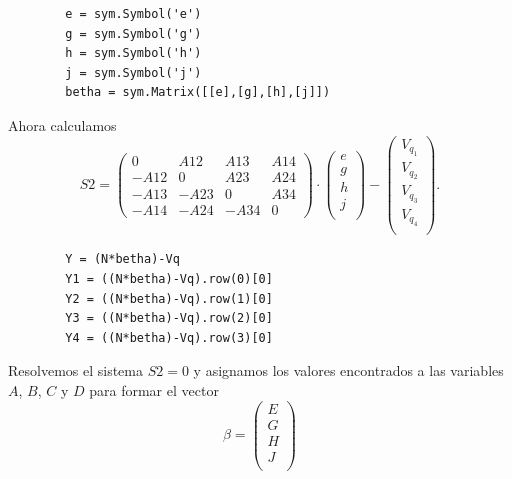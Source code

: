 \documentclass[a4paper,10pt]{book}
\begin{document}
\lstset{stepnumber=0}
\begin{lstlisting}
        e = sym.Symbol('e')
        g = sym.Symbol('g')
        h = sym.Symbol('h')
        j = sym.Symbol('j')            
        betha = sym.Matrix([[e],[g],[h],[j]])
\end{lstlisting}
Ahora calculamos 
\[ S2 = \left( \begin{array}{cccc}
              0   & A12  & A13  & A14  \\
             -A12 & 0    & A23  & A24  \\
             -A13 & -A23 & 0    & A34  \\
             -A14 & -A24 & -A34 & 0   
             \end{array}
   \right) \cdot \left( \begin{array}{c}
               			e \\
               			g \\ 
               			h \\
               			j \\
                   		\end{array}
                 \right)- \left( \begin{array}{c}
               			V_{q_{1}} \\
               			V_{q_{2}} \\ 
               			V_{q_{3}}\\
               			V_{q_{4}} \\
                   		\end{array}
                 \right) .\]
\lstset{stepnumber=0}
\begin{lstlisting}
        Y = (N*betha)-Vq
        Y1 = ((N*betha)-Vq).row(0)[0]
        Y2 = ((N*betha)-Vq).row(1)[0]
        Y3 = ((N*betha)-Vq).row(2)[0]
        Y4 = ((N*betha)-Vq).row(3)[0]
\end{lstlisting}
Resolvemos el sistema $S2=0$ y asignamos los valores encontrados a las variables $A$, $B$, $C$ y $D$ para formar el vector
\[ \beta = \left( \begin{array}{c}
               			E \\
               			G \\ 
               			H \\
               			J \\
                   		\end{array}
                 \right) \] 
\end{document}
